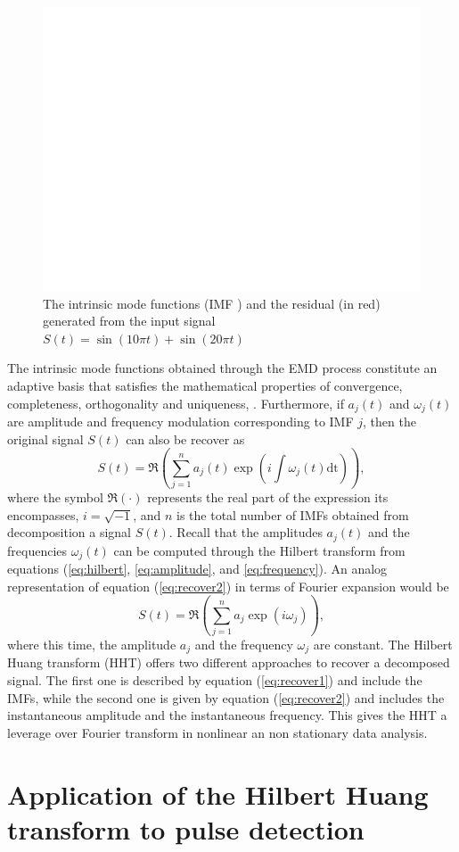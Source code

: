 \documentclass[../Main/thesis.tex]{subfiles}
\begin{document}
\begin{figure}[H] %
   \centering
   \includegraphics[width=6in]{../fig/emd3.png} 
   \caption{The intrinsic mode functions (IMF ) and the residual (in red) generated from the input signal $S(t) = \sin(10 \pi t) + \sin(20 \pi t) $}
   \label{fig:emd3}
\end{figure}
\justify
The intrinsic mode functions obtained through the EMD process constitute an adaptive basis that satisfies the mathematical properties of convergence, completeness, orthogonality and uniqueness, \cite{huang98}. Furthermore, if $a_{j}(t)$ and $\omega_{j}(t)$ are amplitude and frequency modulation corresponding to IMF $j$, then the original signal $S(t)$ can also be recover as 
\begin{equation}\label{eq:recover2}
S(t) = \Re{\left( \sum_{j=1}^{n}a_{j}(t)\exp\left(i\int\omega_{j}(t)\mathrm{dt}\right)  \right)},
\end{equation} 
where the symbol $\Re(\cdot)$ represents the real part of the expression its encompasses, $i=\sqrt{-1}$, and $n$ is the total number of IMFs obtained from decomposition a signal $S(t)$. Recall that the amplitudes $a_{j}(t)$ and the frequencies $\omega_{j}(t)$ can be computed through the Hilbert transform from equations (\ref{eq:hilbert}, \ref{eq:amplitude}, and \ref{eq:frequency}). An analog representation of equation (\ref{eq:recover2}) in terms of Fourier expansion would be 
\begin{equation}\label{eq:recoverFourier}
S(t) = \Re{\left( \sum_{j=1}^{n}a_{j}\exp\left(i\omega_{j}\right)  \right)},
\end{equation} 
where this time, the amplitude $a_{j}$ and the frequency $\omega_{j}$ are constant. The Hilbert Huang transform (HHT) offers two different approaches to recover a decomposed signal. The first one is described by equation (\ref{eq:recover1}) and include the IMFs, while the second one is given by equation (\ref{eq:recover2}) and includes the instantaneous amplitude and the instantaneous frequency. This gives the HHT a leverage over Fourier transform in nonlinear an non stationary data analysis.
\section{Application of the Hilbert Huang transform to pulse detection }
\label{sec:pulse}



\blankpage
\end{document}
